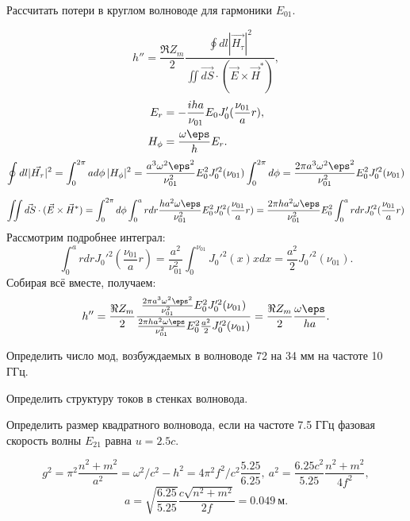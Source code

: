 \begin{problem}
	Рассчитать потери в круглом волноводе для гармоники \(E_{01}\).
\end{problem}
\[
	h'' = \frac{\Re Z_m}{2}\frac{\oint dl |\vec{H_\tau}|^2}{\iint \vec{dS}\cdot(\vec{E}\times\vec{H}^*)},
\]
\begin{align*}
	E_r &= -\frac{iha}{\nu_{01}}E_0 J_0'(\frac{\nu_{01}}{a}r),\\
	H_\phi &= \frac{\omega\eps}{h}E_r.
\end{align*}
\[
	\oint dl |\vec{H_\tau}|^2 = \int_0^{2\pi} a d\phi\,|H_\phi|^2 =
	\frac{a^3\omega^2\eps^2}{\nu_{01}^2}E_0^2J_0'^2(\nu_{01})\int_0^{2\pi} d\phi = \frac{2\pi a^3\omega^2\eps^2}{\nu_{01}^2}E_0^2J_0'^2(\nu_{01})
\]

\[
	\iint \vec{dS}\cdot(\vec{E}\times\vec{H}^*) = \int_0^{2\pi}d\phi\int_0^a rdr \frac{ha^2\omega\eps}{\nu_{01}^2}E_0^2J_0'^2(\frac{\nu_{01}}{a}r)= \frac{2\pi ha^2\omega\eps}{\nu_{01}^2}E_0^2 \int_0^a rdrJ_0'^2(\frac{\nu_{01}}{a}r)
\]
Рассмотрим подробнее интеграл:
\[
	\int_0^a rdr J_0'^2(\frac{\nu_{01}}{a}r) =
	\frac{a^2}{\nu_{01}^2}\int_0^{\nu_{01}} J_0'^2(x) x dx =
	\frac{a^2}{2}J_0'^2(\nu_{01}).
\]
Собирая всё вместе, получаем:
\[
	h'' = \frac{\Re Z_m}{2}\frac{\frac{2\pi a^3\omega^2\eps^2}{\nu_{01}^2}E_0^2J_0'^2(\nu_{01})}{\frac{2\pi ha^2\omega\eps}{\nu_{01}^2}E_0^2\frac{a^2}{2}J_0'^2(\nu_{01})} = \frac{\Re Z_m}{2}\frac{\omega\eps}{ha}.
\]

\begin{problem}
	Определить число мод, возбуждаемых в волноводе 72 на 34 мм на частоте 10 ГГц.
\end{problem}

\begin{problem}
	Определить структуру токов в стенках волновода.
\end{problem}

\begin{problem}
	Определить размер квадратного волновода, если на частоте 7.5 ГГц фазовая скорость волны \(E_{21}\) равна \( u = 2.5c \).
\end{problem}
\[
	g^2 = \pi^2\frac{n^2 + m^2}{a^2} = \omega^2/c^2 - h^2 = 4\pi^2f^2/c^2 \frac{5.25}{6.25},\ a^2 = \frac{6.25 c^2}{5.25}\frac{n^2 + m^2}{4f^2},
\]
\[
	a = \sqrt{\frac{6.25}{5.25}}\frac{c\sqrt{n^2 + m^2}}{2f} = 0.049~\text{м}.
\]
